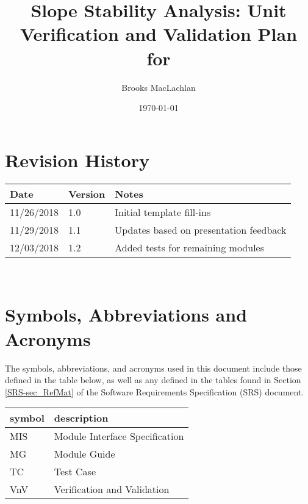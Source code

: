 \documentclass[12pt, titlepage]{article}
\begin{document}
\title{Slope Stability Analysis: Unit Verification and Validation Plan for 
\progname{}} 
\author{Brooks MacLachlan}
\date{\today}
	
\maketitle


\section{Revision History}

\begin{tabularx}{\textwidth}{p{3cm}p{2cm}X}
\toprule {\bf Date} & {\bf Version} & {\bf Notes}\\
\midrule
11/26/2018 & 1.0 & Initial template fill-ins\\
11/29/2018 & 1.1 & Updates based on presentation feedback\\
12/03/2018 & 1.2 & Added tests for remaining modules\\
\bottomrule
\end{tabularx}

~\newpage

\tableofcontents

\listoftables

\newpage

\section{Symbols, Abbreviations and Acronyms}

The symbols, abbreviations, and acronyms used in this document include those 
defined in the table below, as well as any defined in the tables found in 
Section \ref{SRS-sec_RefMat} of the Software Requirements Specification (SRS) 
document.
\newline

\renewcommand{\arraystretch}{1.2}
\begin{tabular}{l l} 
	\toprule		
	\textbf{symbol} & \textbf{description}\\
	\midrule
	MIS & Module Interface Specification\\
	MG & Module Guide\\
	TC & Test Case\\
	VnV & Verification and Validation\\
	\bottomrule
\end{tabular}\\
\end{document}
